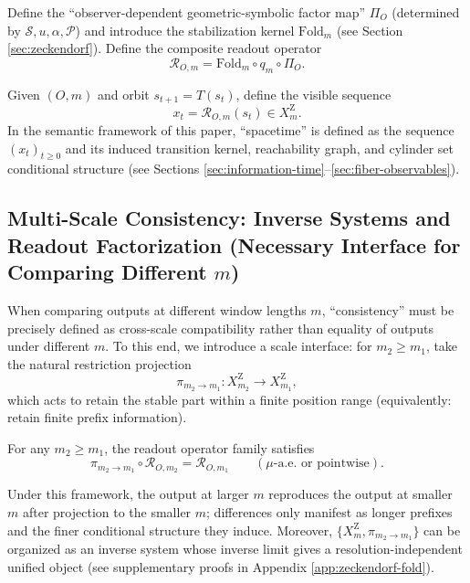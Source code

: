 Define the ``observer-dependent geometric-symbolic factor map'' $\Pi_O$ (determined by $\mathcal{S},u,\alpha,\mathcal{P}$) and introduce the stabilization kernel $\mathrm{Fold}_m$ (see Section \ref{sec:zeckendorf}). Define the composite readout operator
\[
\mathcal{R}_{O,m}=\mathrm{Fold}_m\circ q_m\circ \Pi_O.
\]

\begin{definition}\label{def:spacetime-image}
Given $(O,m)$ and orbit $s_{t+1}=T(s_t)$, define the visible sequence
\[
x_t=\mathcal{R}_{O,m}(s_t)\in X_m^{\mathrm Z}.
\]
In the semantic framework of this paper, ``spacetime'' is defined as the sequence $(x_t)_{t\ge 0}$ and its induced transition kernel, reachability graph, and cylinder set conditional structure (see Sections \ref{sec:information-time}--\ref{sec:fiber-observables}).
\end{definition}

\subsection{Multi-Scale Consistency: Inverse Systems and Readout Factorization (Necessary Interface for Comparing Different \texorpdfstring{$m$}{m})}

When comparing outputs at different window lengths $m$, ``consistency'' must be precisely defined as cross-scale compatibility rather than equality of outputs under different $m$. To this end, we introduce a scale interface: for $m_2\ge m_1$, take the natural restriction projection
\[
\pi_{m_2\to m_1}:X_{m_2}^{\mathrm Z}\to X_{m_1}^{\mathrm Z},
\]
which acts to retain the stable part within a finite position range (equivalently: retain finite prefix information).

\begin{assumption}\label{assump:ontology-scale-factorization}
For any $m_2\ge m_1$, the readout operator family satisfies
\[
\pi_{m_2\to m_1}\circ \mathcal{R}_{O,m_2}=\mathcal{R}_{O,m_1}\qquad (\mu\text{-a.e. or pointwise}).
\]
\end{assumption}

Under this framework, the output at larger $m$ reproduces the output at smaller $m$ after projection to the smaller $m$; differences only manifest as longer prefixes and the finer conditional structure they induce. Moreover, $\{X_m^{\mathrm Z},\pi_{m_2\to m_1}\}$ can be organized as an inverse system whose inverse limit gives a resolution-independent unified object (see supplementary proofs in Appendix \ref{app:zeckendorf-fold}).

